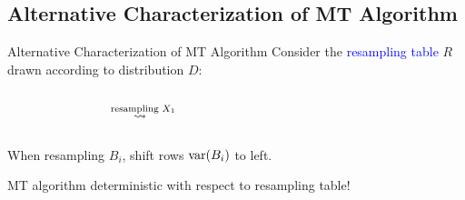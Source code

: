 \documentclass{beamer}
\def\padding{\vspace{0.5cm}}
\def\spadding{\vspace{0.25cm}}
\def\b{\textcolor{blue}}
\begin{document}
\subsection{Alternative Characterization of MT Algorithm}
\begin{frame}{Alternative Characterization of MT Algorithm}
Consider the \b{resampling table} $R$ drawn according to distribution $D$:\spadding

\begin{columns}
\begin{column}{.25\textwidth}
\vspace{0.15em}\pause
\end{column}\pause
\begin{column}{.1\textwidth}
\centering $\overset{\text{resampling $X_1$}}{\rightsquigarrow\hspace{0.5em}}$
\end{column}
\begin{column}{.3\textwidth}

\end{column}
\begin{column}{.05\textwidth}
\end{column}
\end{columns}\pause

When resampling $B_i$, shift rows $\mathrm{var}(B_i)$ to left.\pause\padding

\follows MT algorithm deterministic with respect to resampling table!
\end{frame}

    
    
\end{document}
